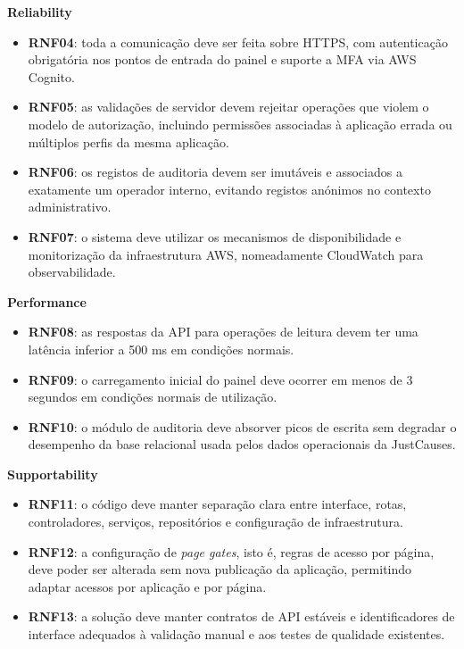 \noindent\textbf{Reliability}
\begin{itemize}
  \item \textbf{RNF04}: toda a comunicação deve ser feita sobre HTTPS, com autenticação obrigatória nos pontos de entrada do painel e suporte a \gls{MFA} via AWS Cognito.
  \item \textbf{RNF05}: as validações de servidor devem rejeitar operações que violem o modelo de autorização, incluindo permissões associadas à aplicação errada ou múltiplos perfis da mesma aplicação.
  \item \textbf{RNF06}: os registos de auditoria devem ser imutáveis e associados a exatamente um operador interno, evitando registos anónimos no contexto administrativo.
  \item \textbf{RNF07}: o sistema deve utilizar os mecanismos de disponibilidade e monitorização da infraestrutura AWS, nomeadamente CloudWatch para observabilidade.
\end{itemize}

\noindent\textbf{Performance}
\begin{itemize}
  \item \textbf{RNF08}: as respostas da \gls{API} para operações de leitura devem ter uma latência inferior a 500 ms em condições normais.
  \item \textbf{RNF09}: o carregamento inicial do painel deve ocorrer em menos de 3 segundos em condições normais de utilização.
  \item \textbf{RNF10}: o módulo de auditoria deve absorver picos de escrita sem degradar o desempenho da base relacional usada pelos dados operacionais da JustCauses.
\end{itemize}

\noindent\textbf{Supportability}
\begin{itemize}
  \item \textbf{RNF11}: o código deve manter separação clara entre interface, rotas, controladores, serviços, repositórios e configuração de infraestrutura.
  \item \textbf{RNF12}: a configuração de \textit{page gates}, isto é, regras de acesso por página, deve poder ser alterada sem nova publicação da aplicação, permitindo adaptar acessos por aplicação e por página.
  \item \textbf{RNF13}: a solução deve manter contratos de \gls{API} estáveis e identificadores de interface adequados à validação manual e aos testes de qualidade existentes.
\end{itemize}


